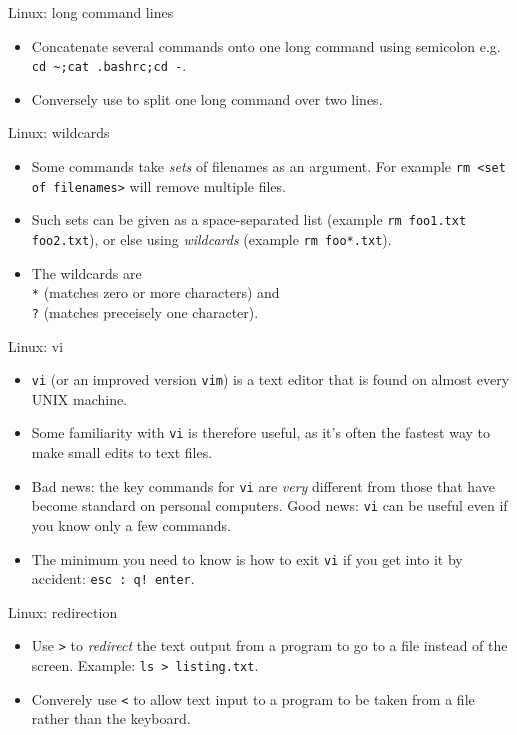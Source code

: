 \documentclass{beamer}
\newcommand{\command}[1]{\colorbox{light-gray}{\texttt{#1}}}
\begin{document}
\begin{frame}{Linux: long command lines}
  \begin{itemize}
  \item Concatenate several commands onto one long command using semicolon e.g. \command{cd \textasciitilde;cat .bashrc;cd -}.
  \item Conversely use \command{} to split one long command over two lines.
  \end{itemize}
\end{frame}

\begin{frame}{Linux: wildcards}
  \begin{itemize}
  \item Some commands take \textit{sets} of filenames as an argument. For example \command{rm <set of filenames>} will remove multiple files.
  \item Such sets can be given as a space-separated list (example \command{rm foo1.txt foo2.txt}), or else using \textit{wildcards} (example \command{rm foo*.txt}).
  \item The wildcards are \\ \command{*} (matches zero or more characters) and \\ \command{?} (matches preceisely one character).
  \end{itemize}
\end{frame}

\begin{frame}{Linux: vi}
  \begin{itemize}
  \item \command{vi} (or an improved version \command{vim}) is a text editor that is found on almost every UNIX machine.
  \item Some familiarity with \command{vi} is therefore useful, as it's often the fastest way to make small edits to text files.
  \item Bad news: the key commands for \command{vi} are \textit{very} different from those that have become standard on personal computers. Good news:  \command{vi} can be useful even if you know only a few commands.
  \item The minimum you need to know is how to exit \command{vi} if you get into it by accident: \command{esc : q! enter}.
  \end{itemize}
\end{frame}

\begin{frame}{Linux: redirection}
  \begin{itemize}
  \item Use \command{>} to \textit{redirect} the text output from a program to go to a file instead of the screen. Example: \command{ls >  listing.txt}.
  \item Converely use \command{<} to allow text input to a program to be taken from a file rather than the keyboard.
  \end{itemize}
\end{frame}
\end{document}
